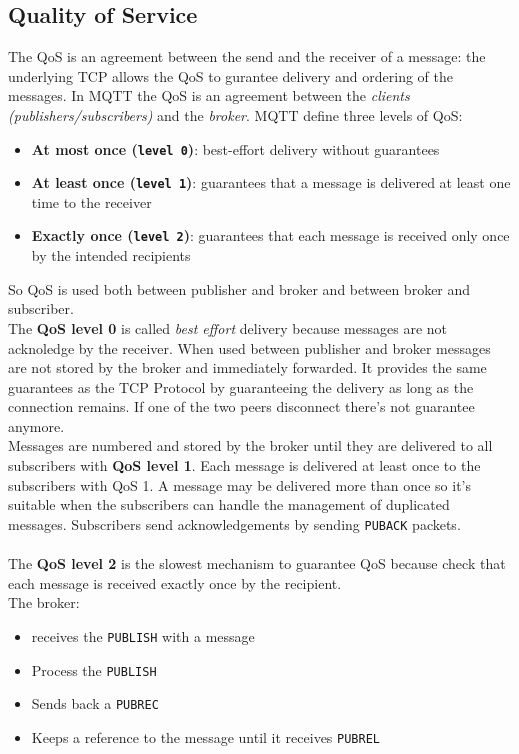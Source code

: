 \documentclass[10pt,a4paper]{report}
\theoremstyle{definition}
\begin{document}
\subsection{Quality of Service}\label{sec:quality-of-service}
The QoS is an agreement between the send and the receiver of a message: the underlying TCP allows the QoS to gurantee delivery and ordering of the messages.
In MQTT the QoS is an agreement between the \textit{clients (publishers/subscribers)} and the \textit{broker}.
MQTT define three levels of QoS:
\begin{itemize}
	\item 
	\textbf{At most once (\texttt{level 0})}: best-effort delivery without guarantees
	\item 
	\textbf{At least once (\texttt{level 1})}: guarantees that a message is delivered at least one time to the receiver
	\item 
	\textbf{Exactly once (\texttt{level 2})}: guarantees that each message is received only once by the intended recipients
	
\end{itemize}
So QoS is used both between publisher and broker and between broker and subscriber.\\
The \textbf{QoS level 0} is called \textit{best effort} delivery because messages are not acknoledge by the receiver. When used between publisher and broker messages are not stored by the broker and immediately forwarded.
It provides the same guarantees as the TCP Protocol by guaranteeing the delivery as long as the connection remains. If one of the two peers disconnect there's not guarantee anymore.\\
Messages are numbered and stored by the broker until they are delivered to all subscribers with \textbf{QoS level 1}. Each message is delivered at least once to the subscribers with QoS 1. A message may be delivered more than once so it's suitable when the subscribers can handle the management of duplicated messages.
Subscribers send acknowledgements by sending \texttt{PUBACK} packets.\\\\
The \textbf{QoS level 2} is the slowest mechanism to guarantee QoS because check that each message is received exactly once by the recipient.\\ 
The broker:
\begin{itemize}
	\item receives the \texttt{PUBLISH} with a message
	\item Process the \texttt{PUBLISH}
	\item Sends back a \texttt{PUBREC}
	\item Keeps a reference to the message until it receives \texttt{PUBREL}
\end{itemize}
\end{document}
